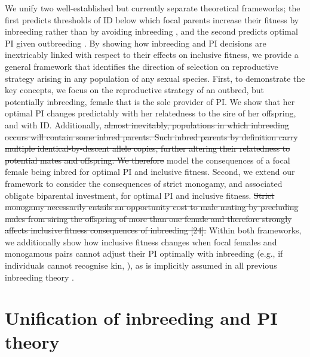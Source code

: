 \documentclass[12pt]{article}
\begin{document}
We unify two well-established but currently separate theoretical frameworks; the first predicts thresholds of ID below which focal parents increase their fitness by inbreeding rather than by avoiding inbreeding \cite[][]{Parker1979}, and the second predicts optimal PI given outbreeding \cite[][]{Macnair1978}. By showing how inbreeding and PI decisions are inextricably linked with respect to their effects on inclusive fitness, we provide a general framework that identifies the direction of selection on reproductive strategy arising in any population of any sexual species. First, to demonstrate the key concepts, we focus on the reproductive strategy of an outbred, but potentially inbreeding, female that is the sole provider of PI. We show that her optimal PI changes predictably with her relatedness to the sire of her offspring, and with ID. Additionally, {\color{red}\st{almost inevitably, populations in which inbreeding occurs will contain some inbred parents. Such inbred parents by definition carry multiple identical-by-descent allele copies, further altering their relatedness to potential mates and offspring. We therefore}} {\color{blue}} model the consequences of a focal female being inbred for optimal PI and inclusive fitness. Second, we extend our framework to consider the consequences of strict monogamy, and associated obligate biparental investment, for optimal PI and inclusive fitness. {\color{red}\st{Strict monogamy necessarily entails an opportunity cost to male mating by precluding males from siring the offspring of more than one female and therefore strongly affects inclusive fitness consequences of inbreeding [24].}} Within both frameworks, we additionally show how inclusive fitness changes when focal females and monogamous pairs cannot adjust their PI optimally with inbreeding (e.g., if individuals cannot recognise kin, \cite[][]{Penn2010}), as is implicitly assumed in all previous inbreeding theory \cite[][]{Parker1979, Parker2006, Waser1986, Kokko2006, Duthie2015a}.

\section*{Unification of inbreeding and PI theory}
\end{document}
